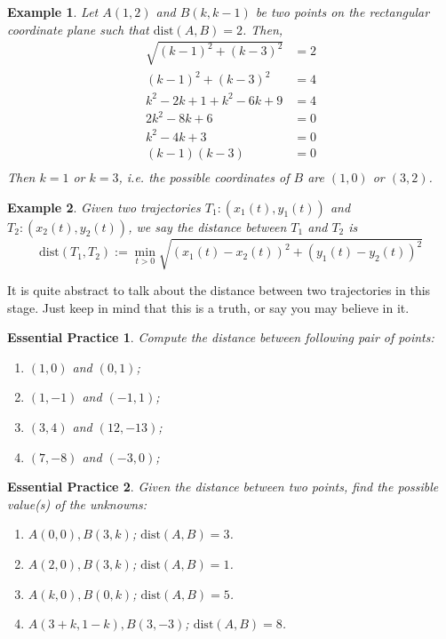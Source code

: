 \documentclass[12pt]{article}
\newtheorem*{example}{Example}
\newtheorem{exercise}{Essential Practice}[subsection]
\begin{document}
    \begin{example}
        Let $A(1,2)$ and $B(k,k-1)$ be two points on the rectangular coordinate plane such that $\mathrm{dist}(A,B)=2$. Then, \begin{align*}
            \sqrt{(k-1)^2+(k-3)^2}&=2\\
            (k-1)^2+(k-3)^2&=4\\
            k^2-2k+1+k^2-6k+9&=4\\
            2k^2-8k+6&=0\\
            k^2-4k+3&=0\\
            (k-1)(k-3)&=0\\
        \end{align*}
        Then $k=1$ or $k=3$, i.e. the possible coordinates of $B$ are $(1,0)$ or $(3,2)$.
    \end{example}

    \begin{example}
        Given two trajectories $T_1:(x_1(t),y_1(t))$ and $T_2:(x_2(t),y_2(t))$, we say the distance between $T_1$ and $T_2$ is $$\mathrm{dist}(T_1,T_2):=\min_{t>0}\sqrt{(x_1(t)-x_2(t))^2+(y_1(t)-y_2(t))^2}$$
    \end{example}

    It is quite abstract to talk about the distance between two trajectories in this stage. Just keep in mind that this is a truth, or say you may believe in it.

    \begin{exercise}
        Compute the distance between following pair of points:\begin{enumerate}
            \item $(1,0)$ and $(0,1)$;
            \item $(1,-1)$ and $(-1,1)$;
            \item $(3,4)$ and $(12,-13)$;
            \item $(7,-8)$ and $(-3,0)$;
        \end{enumerate}
    \end{exercise}

    \begin{exercise}
        Given the distance between two points, find the possible value(s) of the unknowns:\begin{enumerate}
            \item $A(0,0), B(3,k)$; $\mathrm{dist}(A,B)=3$.
            \item $A(2,0), B(3,k)$; $\mathrm{dist}(A,B)=1$.
            \item $A(k,0), B(0,k)$; $\mathrm{dist}(A,B)=5$.
            \item $A(3+k,1-k), B(3,-3)$; $\mathrm{dist}(A,B)=8$.
        \end{enumerate}
    \end{exercise}
\end{document}
